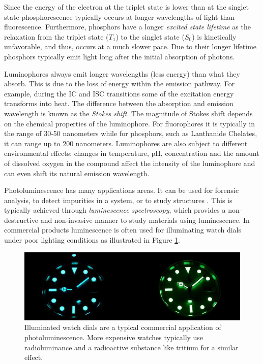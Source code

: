 \documentclass[thesis.tex]{subfiles}
\begin{document}
Since the energy of the electron at the triplet state is lower than at the singlet state phosphorescence typically occurs at longer wavelengths of light than fluorescence. Furthermore, phosphors have a longer \emph{excited state lifetime} as the relaxation from the triplet state ($T_1$) to the singlet state ($S_0$) is kinetically unfavorable, and thus, occurs at a much slower pace. Due to their longer lifetime phosphors typically emit light long after the initial absorption of photons. \cite{CEJ}

Luminophores always emit longer wavelengths (less energy) than what they absorb. This is due to the loss of energy within the emission pathway. For example, during the IC and ISC transitions some of the excitation energy transforms into heat. The difference between the absorption and emission wavelength is known as the \emph{Stokes shift}. The magnitude of Stokes shift depends on the chemical properties of the luminophore. For fluorophores it is typically in the range of 30-50 nanometers while for phosphors, such as Lanthanide Chelates, it can range up to 200 nanometers. Luminophores are also subject to different environmental effects: changes in temperature, pH, concentration and the amount of dissolved oxygen in the compound affect the intensity of the luminophore and can even shift its natural emission wavelength. \cite{luminescence_basics}\cite{hemmila}

Photoluminescence has many applications areas. It can be used for forensic analysis, to detect impurities in a system, or to study structures \cite{photoluminescence_use_case_2}\cite{photoluminescence_use_case_1}\cite{photoluminescence_use_case_3}. This is typically achieved through \emph{luminescence spectroscopy}, which provides a non-destructive and non-invasive manner to study materials using luminescence. In commercial products luminescence is often used for illuminating watch dials under poor lighting conditions as illustrated in Figure \ref{figure:photoluminescence_example}.

\begin{figure}[h!]
\centering \includegraphics[width=\textwidth]{images/photoluminescence_example}
\caption{Illuminated watch dials are a typical commercial application of photoluminescence. More expensive watches typically use radioluminance and a radioactive substance like tritium for a similar effect.\label{figure:photoluminescence_example}}
\end{figure}
\end{document}
